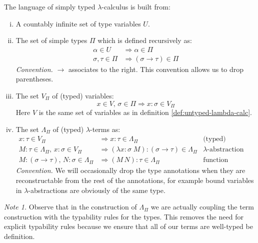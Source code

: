 \begin{definition}
\label{def:stlambda}
The language of simply typed $\lambda$-calculus is built from:
    \begin{enumerate}[(i)]
        \item A countably infinite set of type variables $U$.
        \item The set of simple types $\Pi$ which is defined recursively as:
        \begin{align*}
            \alpha \in U &\Rightarrow \alpha \in \Pi \\
            \sigma, \tau \in \Pi &\Rightarrow (\sigma \to \tau) \in \Pi
        \end{align*}
            \emph{Convention.} $\to$ associates to the right. This convention
            allows us to drop parentheses.
        \item The set $V_\Pi$ of (typed) variables:
            \[ x \in V,\, \sigma \in \Pi \Rightarrow x\!:\!\sigma \in V_\Pi \]
                Here $V$ is the same set of variables as in definition
                \ref{def:untyped-lambda-calc}.
        \item The set $\Lambda_\Pi$ of (typed) $\lambda$-terms as:
                \begin{align*}
                    x\!:\!\tau \in V_\Pi
                        &\Rightarrow x\!:\!\tau \in \Lambda_\Pi &
                            \text{(typed) variables} \\
                    M\!:\!\tau \in \Lambda_\Pi,\, x\!:\!\sigma \in V_\Pi
                        &\Rightarrow (\lambda x\!:\!\sigma\; M)\!:\!(\sigma \to
                        \tau) \in \Lambda_\Pi &
                            \text{$\lambda$-abstraction} \\
                    M\!:\!(\sigma \to \tau),\, N\!:\!\sigma \in \Lambda_\Pi
                        &\Rightarrow (M\, N)\!:\!\tau \in \Lambda_\Pi &
                            \text{function application}
                \end{align*}
            \emph{Convention.} We will occasionally drop the type annotations
            when they are reconstructable from the rest of the annotations, for
            example bound variables in $\lambda$-abstractions are obviously of
            the same type.

        \end{enumerate}
\end{definition}
\emph{Note 1.}
    Observe that in the construction of $\Lambda_\Pi$ we are actually coupling the
    term construction with the typability rules for the types. This removes the
    need for explicit typability rules because we ensure that all of our terms
    are well-typed be definition.

